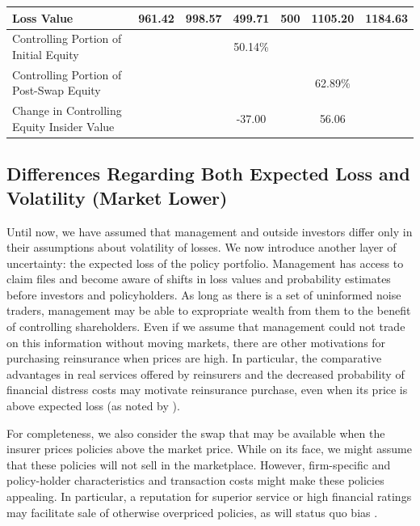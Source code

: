 \begin{table}
\begin{center}
\begin{tabular}{p{2in}cccccc}
Loss Value & 961.42 &    998.57 &   499.71 &        500 &   1105.20 &   1184.63 \\ 

\midrule

Controlling Portion of Initial Equity &            &            &   50.14\% &            &            &            \\ 

Controlling Portion of Post-Swap Equity &            &            &            &            &   62.89\% &            \\ 
\midrule
Change in Controlling Equity Insider Value &            &            &   -37.00 &            &    56.06 &            \\ 
\bottomrule

\end{tabular}  
\end{center}
\end{table}

\subsection{Differences Regarding Both Expected Loss and Volatility (Market Lower)}

Until now, we have assumed that management and outside investors differ only in their assumptions about volatility of losses.  We now introduce another layer of uncertainty: the expected loss of the policy portfolio.  Management has access to claim files and become aware of shifts in loss values and probability estimates before investors and policyholders.  As long as there is a set of uninformed noise traders, management may be able to expropriate wealth from them to the benefit of controlling shareholders.  Even if we assume that management could not trade on this information without moving markets, there are other motivations for purchasing reinsurance when prices are high.  In particular, the comparative advantages in real services offered by reinsurers and the decreased probability of financial distress costs may motivate reinsurance purchase, even when its price is above expected loss (as noted by \citet{mayers1990a}).

For completeness, we also consider the swap that may be available when the insurer prices policies above the market price.  While on its face, we might assume that these policies will not sell in the marketplace. However, firm-specific and policy-holder characteristics and transaction costs might make these policies appealing.  In particular, a reputation for superior service or high financial ratings may facilitate sale of otherwise overpriced policies, as will status quo bias \citep{samuelson1988a}.

